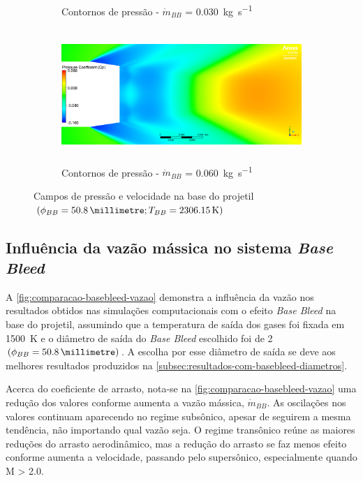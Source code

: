 \begin{figure}
\begin{subfigure}[b]{0.47\textwidth}
        \caption{Contornos de pressão - \(\Dot{m}_{BB}\) = \qty{0,030}{\kilogram\per\second}}
        \label{fig:contorno-pressao-base-bb-2pol-vazao0030}
    \end{subfigure}
    \hfill
    \begin{subfigure}[b]{0.47\textwidth} %
        \centering
        \includegraphics[height=5cm,width=\textwidth]{coeficientepressao-vazao0060-temp2306-diam2pol.png}
        \caption{Contornos de pressão - \(\Dot{m}_{BB}\) = \qty{0,060}{\kilogram\per\second}}
        \label{fig:contorno-pressao-base-bb-2pol-vazao0030}
    \end{subfigure}
	\caption{Campos de pressão e velocidade na base do projetil \(\left(\phi_{BB} = \qty{50,8}{\millimetre}; T_{BB} = \qty{2306,15}{\kelvin}\right)\)}
	\label{fig:influencia-base-diametro-vazao-2pol}
\end{figure}

\subsection{Influência da vazão mássica no sistema \textit{Base Bleed}} \label{subsec:resultados-com-basebleed-vazao}

A \autoref{fig:comparacao-basebleed-vazao} demonstra a influência da vazão nos resultados obtidos nas simulações computacionais com o efeito \textit{Base Bleed} na base do projetil, assumindo que a temperatura de saída dos gases foi fixada em \qty{1500}{\kelvin} e o diâmetro de saída do \textit{Base Bleed} escolhido foi de \qty{2}{\polegada} \(\left(\phi_{BB} = \qty{50,8}{\millimetre}\right)\). A escolha por esse diâmetro de saída se deve aos melhores resultados produzidos na \autoref{subsec:resultados-com-basebleed-diametros}.

Acerca do coeficiente de arrasto, nota-se na \autoref{fig:comparacao-basebleed-vazao} uma redução dos valores conforme aumenta a vazão mássica, \(\Dot{m}_{BB}\). As oscilações nos valores continuam aparecendo no regime subsônico, apesar de seguirem a mesma tendência, não importando qual vazão seja. O regime transônico reúne as maiores reduções do arrasto aerodinâmico, mas a redução do arrasto se faz menos efeito conforme aumenta a velocidade, passando pelo supersônico, especialmente quando M > \num{2,0}.

